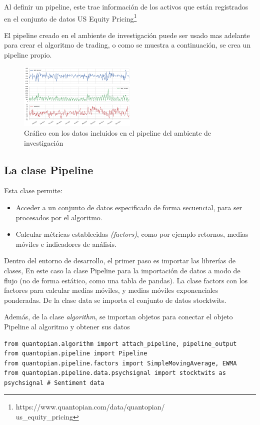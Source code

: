 \documentclass[a4paper, 11pt, twocolumn]{article}
\begin{document}
Al definir un pipeline, este trae información de los activos que están registrados en el conjunto de datos US Equity Pricing\footnote{https://www.quantopian.com/data/quantopian/
\\us\_equity\_pricing}

El pipeline creado en el ambiente de investigación puede ser usado mas adelante para crear el algoritmo de trading, o como se muestra a continuación, se crea un pipeline propio.

\begin{figure}[ht]
\centering
\includegraphics[width=0.5\textwidth]{research.png}
\caption{\label{fig:sol_iter}Gráfico con los datos incluidos en el pipeline del ambiente de investigación}
\end{figure}


\subsection{La clase Pipeline}
Esta clase permite:

\begin{itemize}
    \item Acceder a un conjunto de datos especificado de forma secuencial, para ser procesados por el algoritmo.
    \item Calcular métricas establecidas \textit{(factors)}, como por ejemplo retornos, medias móviles e indicadores de análisis.
\end{itemize}

Dentro del entorno de desarrollo, el primer paso es importar las librerías de clases, En este caso la clase Pipeline para la importación de datos a modo de flujo (no de forma estático, como una tabla de pandas). La clase factors con los factores para calcular medias móviles, y medias móviles exponenciales ponderadas. De la clase data se importa el conjunto de datos stocktwits.

Además, de la clase \textit{algorithm}, se importan objetos para conectar el objeto Pipeline al algoritmo y obtener sus datos

\lstset{columns=fullflexible, xleftmargin=1cm, basicstyle=\footnotesize, language=Python, breaklines=true, numbers=left} 
\begin{lstlisting}
from quantopian.algorithm import attach_pipeline, pipeline_output
from quantopian.pipeline import Pipeline
from quantopian.pipeline.factors import SimpleMovingAverage, EWMA
from quantopian.pipeline.data.psychsignal import stocktwits as psychsignal # Sentiment data
\end{lstlisting}
\end{document}

